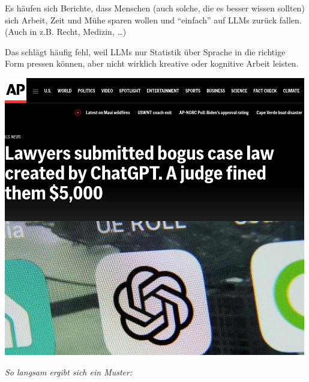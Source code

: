 \documentclass[aspectratio=169,usenames,dvipsnames]{beamer}
\begin{document}
\begin{frame}
\begin{minipage}{0.4\textwidth}
Es häufen sich Berichte, dass Menschen (auch solche, die es besser wissen sollten)
sich Arbeit, Zeit und Mühe sparen wollen und ``einfach'' auf LLMs zurück fallen.\\
(Auch in z.B. Recht, Medizin, \dots)\bigskip

Das schlägt häufig fehl, weil LLMs nur Statistik über Sprache in die richtige Form pressen können,
aber nicht wirklich kreative oder kognitive Arbeit leisten.
\end{minipage}\hfill\begin{minipage}{0.48\textwidth}
\begin{center}
\includegraphics[width=0.99\textwidth, keepaspectratio]{images/chatgpt_bogus_case_law} 
\end{center}
\end{minipage}
\end{frame}

\begin{frame}
\begin{center}
\Large
\emph{So langsam ergibt sich ein Muster:}
\bigskip\bigskip

\color{BrickRed}{Expert*Innen $\rightarrow$ LLMs $\rightarrow$ Nutzer*Innen\\
geht häufig schief\dots}
\pause
\bigskip

\color{OliveGreen}{LLMs $\rightarrow$ Expert*Innen $\rightarrow$ Nutzer*Innen\\
wäre besser!}
\end{center}
\end{frame}
\end{document}
